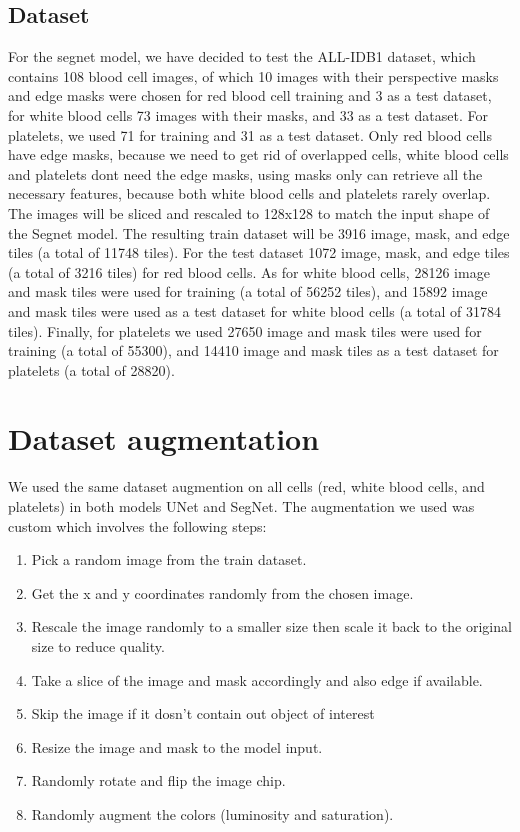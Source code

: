 \subsection{Dataset}
\hspace{\parindent}
For the segnet model, we have decided to test the ALL-IDB1 dataset, which contains 108 blood cell images, of which 10 images with their perspective masks and edge masks were chosen for red blood cell training and 3 as a test dataset, for white blood cells 73 images with their masks, and 33 as a test dataset.
For platelets, we used 71 for training and 31 as a test dataset.
Only red blood cells have edge masks, because we need to get rid of overlapped cells, white blood cells and platelets dont need the edge masks, using masks only can retrieve all the necessary features, because both white blood cells and platelets rarely overlap.
The images will be sliced and rescaled to 128x128 to match the input shape of the Segnet model.
The resulting train dataset will be 3916 image, mask, and edge tiles (a total of 11748 tiles).
For the test dataset 1072 image, mask, and edge tiles (a total of 3216 tiles) for red blood cells.
As for white blood cells, 28126 image and mask tiles were used for training (a total of 56252 tiles), and 15892 image and mask tiles were used as a test dataset for white blood cells (a total of 31784 tiles).
Finally, for platelets we used 27650 image and mask tiles were used for training (a total of 55300), and 14410 image and mask tiles as a test dataset for platelets (a total of 28820).

\vspace{0.1in}



\section{Dataset augmentation}
\hspace{\parindent}
We used the same dataset augmention on all cells (red, white blood cells, and platelets) in both models UNet and SegNet.
The augmentation we used was custom which involves the following steps:
\begin{enumerate}
    \item Pick a random image from the train dataset.
    \item Get the x and y coordinates randomly from the chosen image.
    \item Rescale the image randomly to a smaller size then scale it back to the original size to reduce quality.
    \item Take a slice of the image and mask accordingly and also edge if available.
    \item Skip the image if it dosn't contain out object of interest
    \item Resize the image and mask to the model input.
    \item Randomly rotate and flip the image chip.
    \item Randomly augment the colors (luminosity and saturation).
\end{enumerate}

